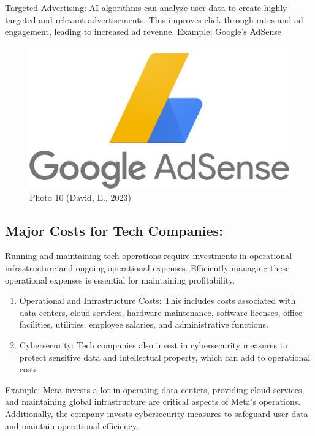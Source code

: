 \documentclass[
]{article}
\begin{document}
Targeted Advertising: AI algorithms can analyze user data to create highly targeted and relevant advertisements. This improves click-through rates and ad engagement, leading to increased ad revenue.
Example: Google's AdSense

\begin{figure}
\centering
\includegraphics{tech3.png}
\caption{Photo 10 (David, E., 2023)}
\end{figure}

\hypertarget{major-costs-for-tech-companies}{%
\subsection{Major Costs for Tech Companies:}\label{major-costs-for-tech-companies}}

Running and maintaining tech operations require investments in operational infrastructure and ongoing operational expenses. Efficiently managing these operational expenses is essential for maintaining profitability.

\begin{enumerate}
\def\labelenumi{\arabic{enumi}.}
\item
  Operational and Infrastructure Costs: This includes costs associated with data centers, cloud services, hardware maintenance, software licenses, office facilities, utilities, employee salaries, and administrative functions.
\item
  Cybersecurity: Tech companies also invest in cybersecurity measures to protect sensitive data and intellectual property, which can add to operational costs.
\end{enumerate}

Example: Meta invests a lot in operating data centers, providing cloud services, and maintaining global infrastructure are critical aspects of Meta's operations. Additionally, the company invests cybersecurity measures to safeguard user data and maintain operational efficiency.
\end{document}
